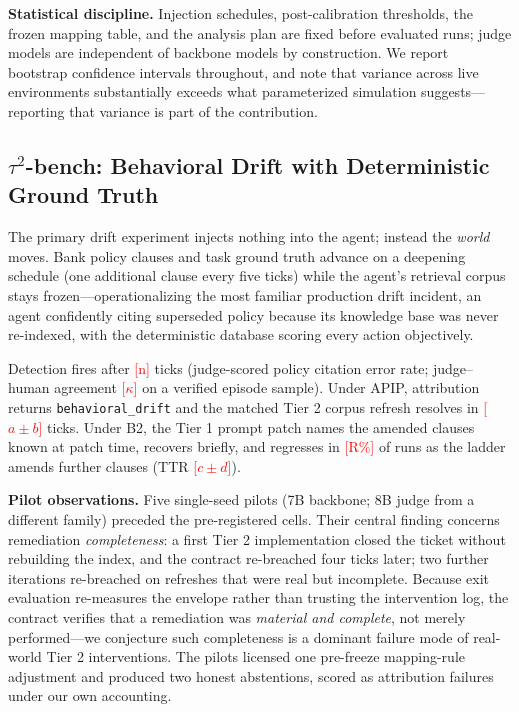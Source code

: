 \documentclass[conference]{IEEEtran}
\newcommand{\ph}[1]{\textcolor{red}{[#1]}}
\newcommand{\code}[1]{\texttt{\small #1}}
\begin{document}
\textbf{Statistical discipline.} Injection schedules, post-calibration
thresholds, the frozen mapping table, and the analysis plan are fixed before
evaluated runs; judge models are independent of backbone models by
construction. We report bootstrap confidence intervals throughout, and note
that variance across live environments substantially exceeds what parameterized
simulation suggests---reporting that variance is part of the contribution.

\subsection{$\tau^2$-bench: Behavioral Drift with Deterministic Ground Truth}
\label{sec:taubench}

The primary drift experiment injects nothing into the agent; instead the
\emph{world} moves. Bank policy clauses and task ground truth advance on a
deepening schedule (one additional clause every five ticks) while the agent's
retrieval corpus stays frozen---operationalizing the most familiar production
drift incident, an agent confidently citing superseded policy because its
knowledge base was never re-indexed, with the deterministic database scoring
every action objectively.

Detection fires after \ph{n} ticks (judge-scored policy citation error rate;
judge--human agreement \ph{$\kappa$} on a verified episode sample). Under APIP,
attribution returns \code{behavioral\_drift} and the matched Tier 2 corpus
refresh resolves in \ph{$a \pm b$} ticks. Under B2, the Tier 1 prompt patch
names the amended clauses known at patch time, recovers briefly, and regresses
in \ph{R\%} of runs as the ladder amends further clauses (TTR \ph{$c \pm d$}).

\textbf{Pilot observations.} Five single-seed pilots (7B backbone; 8B judge
from a different family) preceded the pre-registered cells. Their central
finding concerns remediation \emph{completeness}: a
first Tier 2 implementation closed the ticket without rebuilding the index, and
the contract re-breached four ticks later; two further iterations re-breached
on refreshes that were real but incomplete. Because exit evaluation re-measures
the envelope rather than trusting the intervention log, the contract verifies
that a remediation was \emph{material and complete}, not merely performed---we
conjecture such completeness is a dominant failure mode of real-world Tier 2
interventions. The pilots licensed one pre-freeze mapping-rule adjustment and
produced two honest abstentions, scored as attribution failures under our own
accounting.
\end{document}
